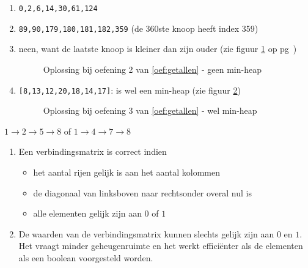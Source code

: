 \begin{Oplossing}{6.7}
\begin{enumerate}
\item \verb/0,2,6,14,30,61,124/
\item \verb/89,90,179,180,181,182,359/ (de 360ste knoop heeft index 359)
\item neen, want de laatste knoop is kleiner dan zijn ouder  (zie figuur \ref{fig:geenMinHeap} op pg~\pageref{fig:geenMinHeap})
\begin{figure}[htbp]
    \centering
{}
\caption{Oplossing bij oefening 2 van \ref{oef:getallen} - geen min-heap}
\label{fig:geenMinHeap}
\end{figure}
\item \verb/[8,13,12,20,18,14,17]/: is wel een min-heap (zie figuur \ref{fig:welMinHeap})
\begin{figure}[htbp]
    \centering
{}
\caption{Oplossing bij oefening 3 van \ref{oef:getallen} - wel min-heap}
\label{fig:welMinHeap}
\end{figure}
\end{enumerate}
\end{Oplossing}
\begin{Oplossing}{7.1}
$1\rightarrow2\rightarrow5\rightarrow8$ of $1\rightarrow4\rightarrow7\rightarrow8$
\end{Oplossing}
\begin{Oplossing}{7.2}
\begin{enumerate}
\item Een verbindingsmatrix is correct indien
\begin{itemize}
\item het aantal rijen gelijk is aan het aantal kolommen
\item de diagonaal van linksboven naar rechtsonder overal nul is
\item alle elementen gelijk zijn aan $0$ of $1$
\end{itemize}
\item De waarden van de verbindingsmatrix kunnen slechts gelijk zijn aan $0$ en $1$. Het vraagt minder geheugenruimte en het werkt efficiënter als de elementen als een boolean voorgesteld worden.
\end{enumerate}
\end{Oplossing}
